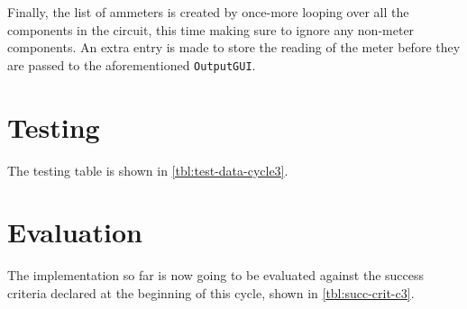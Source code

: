 
    Finally, the list of ammeters is created by once-more looping over all the components in the circuit, this time making sure to ignore any non-meter components.
    An extra entry is made to store the reading of the meter before they are passed to the aforementioned \verb|OutputGUI|.

\section{Testing}

    The testing table is shown in \autoref{tbl:test-data-cycle3}.

\section{Evaluation}
    The implementation so far is now going to be evaluated against the success criteria declared at the beginning of this cycle, shown in \autoref{tbl:succ-crit-c3}. 

